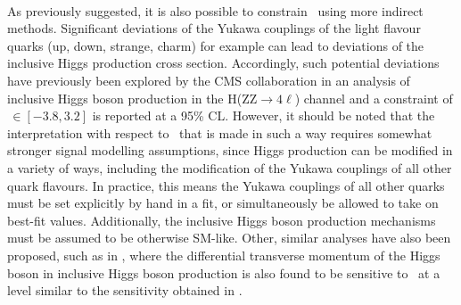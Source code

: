 \\
As previously suggested, it is also possible to constrain \kappac \, using more indirect methods. Significant deviations of the Yukawa couplings of the light flavour quarks (up, down, strange, charm) for example can lead to deviations of the inclusive Higgs production cross section. Accordingly, such potential deviations have previously been explored by the CMS collaboration in an analysis of inclusive Higgs boson production in the H(ZZ$\rightarrow4\ell$) channel \cite{gammaHProduction} and a constraint of \kappac$\,\in[-3.8, 3.2]$ is reported at a 95\% CL. However, it should be noted that the interpretation with respect to \kappac \, that is made in such a way requires somewhat stronger signal modelling assumptions, since Higgs production can be modified in a variety of ways, including the modification of the Yukawa couplings of all other quark flavours. In practice, this means the Yukawa couplings of all other quarks must be set explicitly by hand in a fit, or simultaneously be allowed to take on best-fit values. Additionally, the inclusive Higgs boson production mechanisms must be assumed to be otherwise SM-like. Other, similar analyses have also been proposed, such as in \cite{Bishara_2017}, where the differential transverse momentum of the Higgs boson in inclusive Higgs boson production is also found to be sensitive to \kappac \, at a level similar to the sensitivity obtained in \cite{gammaHProduction}. \\
\\
